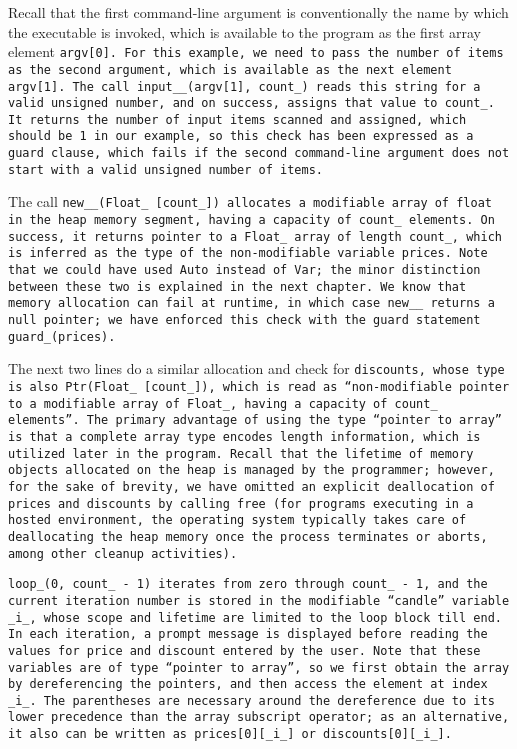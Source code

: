 Recall that the first command-line argument is
conventionally the name by which the executable is invoked,
which is available to the program as the first array element \tt{argv[0]}.
For this example, we need to pass the number of items as the second argument,
which is available as the next element \tt{argv[1]}.
The call \tt{input__(argv[1], count_)} reads this string for a valid
unsigned number, and on success, assigns that value to \tt{count_}.
It returns the number of input items scanned and assigned,
which should be 1 in our example,
so this check has been expressed as a guard clause,
which fails if the second command-line argument
does not start with a valid unsigned number of items.

The call \tt{new__(Float_ [count_])} allocates a modifiable array of \tt{float}
in the heap memory segment, having a capacity of \tt{count_} elements.
On success, it returns pointer to a \tt{Float_} array of length \tt{count_},
which is inferred as the type of the non-modifiable variable \tt{prices}.
Note that we could have used \tt{Auto} instead of \tt{Var};
the minor distinction between these two is explained in the next chapter.
We know that memory allocation can fail at runtime,
in which case \tt{new__} returns a null pointer;
we have enforced this check with the guard statement \tt{guard_(prices)}.

The next two lines do a similar allocation and check for \tt{discounts},
whose type is also \tt{Ptr(Float_ [count_])}, which is read as
``non-modifiable pointer to a modifiable array of \tt{Float_},
having a capacity of \tt{count_} elements''.
The primary advantage of using the type ``pointer to array''
is that a complete array type encodes length information,
which is utilized later in the program.
Recall that the lifetime of memory objects
allocated on the heap is managed by the programmer;
however, for the sake of brevity, we have omitted an explicit
deallocation of \tt{prices} and \tt{discounts} by calling \tt{free}
(for programs executing in a hosted environment, the operating
system typically takes care of deallocating the heap memory once
the process terminates or aborts, among other cleanup activities).

\tt{loop_(0, count_ - 1)} iterates from zero through \tt{count_ - 1}, and the
current iteration number is stored in the modifiable ``candle'' variable
\tt{_i_}, whose scope and lifetime are limited to the loop block till \tt{end}.
In each iteration, a prompt message is displayed before reading the values for
price and discount entered by the user.
Note that these variables are of type ``pointer to array'',
so we first obtain the array by dereferencing the pointers,
and then access the element at index \tt{_i_}.
The parentheses are necessary around the dereference due
to its lower precedence than the array subscript operator;
as an alternative, it also can be written as
\tt{prices[0][_i_]} or \tt{discounts[0][_i_]}.

